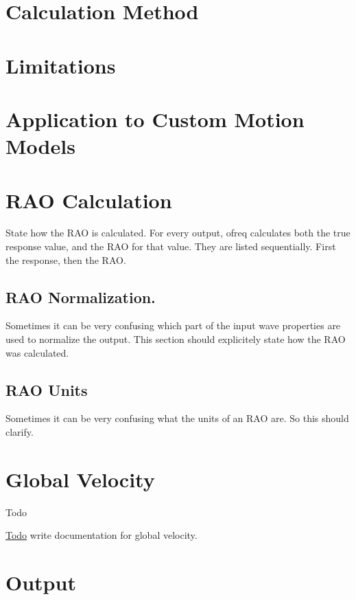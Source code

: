 \section*{Calculation Method}

\section*{Limitations}

\section*{Application to Custom Motion Models}

\section*{R\-A\-O Calculation}

State how the R\-A\-O is calculated. For every output, ofreq calculates both the true response value, and the R\-A\-O for that value. They are listed sequentially. First the response, then the R\-A\-O.

\subsection*{R\-A\-O Normalization.}

Sometimes it can be very confusing which part of the input wave properties are used to normalize the output. This section should explicitely state how the R\-A\-O was calculated.

\subsection*{R\-A\-O Units}

Sometimes it can be very confusing what the units of an R\-A\-O are. So this should clarify. \hypertarget{global_velocity}{}\section{Global Velocity}\label{global_velocity}
\begin{DoxyRefDesc}{Todo}
\item[\hyperlink{todo__todo000022}{Todo}]write documentation for global velocity.\end{DoxyRefDesc}


\section*{Output}

